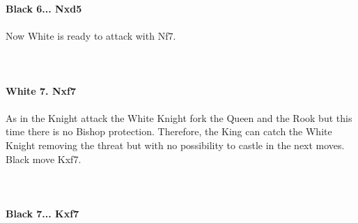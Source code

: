 \documentclass{article}
\begin{document}
\textbf{Black 6... Nxd5}\\
\\
Now White is ready to attack with Nf7.\\
\\

\\
\\
\textbf{White 7. Nxf7}\\
\\
As in the Knight attack the White Knight fork the Queen and the Rook but this time there is no Bishop protection. Therefore, the King can catch the White Knight removing the threat but with no possibility to castle in the next moves. Black move Kxf7.\\
\\

\\
\\
\textbf{Black 7... Kxf7}\\
\\
\end{document}
